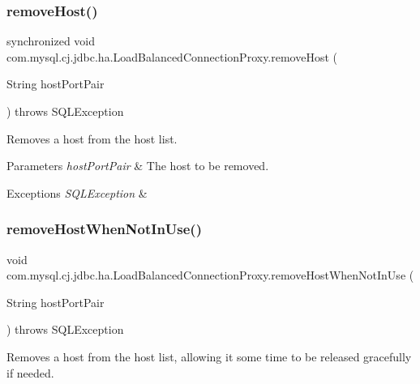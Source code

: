 \subsubsection{\texorpdfstring{remove\+Host()}{removeHost()}}
{\footnotesize\ttfamily synchronized void com.\+mysql.\+cj.\+jdbc.\+ha.\+Load\+Balanced\+Connection\+Proxy.\+remove\+Host (\begin{DoxyParamCaption}\item[{String}]{host\+Port\+Pair }\end{DoxyParamCaption}) throws S\+Q\+L\+Exception}

Removes a host from the host list.


\begin{DoxyParams}{Parameters}
{\em host\+Port\+Pair} & The host to be removed. \\
\hline
\end{DoxyParams}

\begin{DoxyExceptions}{Exceptions}
{\em S\+Q\+L\+Exception} & \\
\hline
\end{DoxyExceptions}
\mbox{\label{classcom_1_1mysql_1_1cj_1_1jdbc_1_1ha_1_1_load_balanced_connection_proxy_a979d78c2f78920bb885e9eb73c4b37d0}} 
\subsubsection{\texorpdfstring{remove\+Host\+When\+Not\+In\+Use()}{removeHostWhenNotInUse()}}
{\footnotesize\ttfamily void com.\+mysql.\+cj.\+jdbc.\+ha.\+Load\+Balanced\+Connection\+Proxy.\+remove\+Host\+When\+Not\+In\+Use (\begin{DoxyParamCaption}\item[{String}]{host\+Port\+Pair }\end{DoxyParamCaption}) throws S\+Q\+L\+Exception}

Removes a host from the host list, allowing it some time to be released gracefully if needed.



